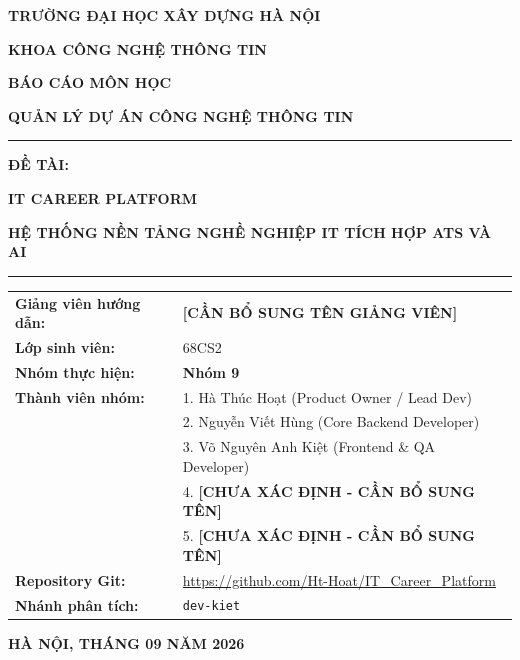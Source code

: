 \documentclass[12pt,a4paper,oneside]{report}
\begin{document}
\begin{titlepage}
\begin{center}
    {\fontsize{13}{16}\selectfont \textbf{TRƯỜNG ĐẠI HỌC XÂY DỰNG HÀ NỘI}\par}
    {\fontsize{13}{16}\selectfont \textbf{KHOA CÔNG NGHỆ THÔNG TIN}\par}
    \vspace{1.5cm}
    \vspace{1.5cm}
    {\fontsize{18}{22}\selectfont \textbf{BÁO CÁO MÔN HỌC}\par}
    {\fontsize{20}{26}\selectfont \textbf{QUẢN LÝ DỰ ÁN CÔNG NGHỆ THÔNG TIN}\par}
    \vspace{1cm}
    \rule{\textwidth}{1.5pt}\par
    \vspace{0.5cm}
    {\fontsize{16}{22}\selectfont \textbf{ĐỀ TÀI:}\par}
    \vspace{0.3cm}
    {\fontsize{18}{24}\selectfont \textbf{IT CAREER PLATFORM}\par}
    {\fontsize{15}{20}\selectfont \textbf{HỆ THỐNG NỀN TẢNG NGHỀ NGHIỆP IT TÍCH HỢP ATS VÀ AI}\par}
    \vspace{0.5cm}
    \rule{\textwidth}{1.5pt}\par
    \vspace{2cm}

    \begin{tabularx}{\textwidth}{p{4.5cm} X}
        \textbf{Giảng viên hướng dẫn:} & \textbf{[CẦN BỔ SUNG TÊN GIẢNG VIÊN]} \\
        \addlinespace
        \textbf{Lớp sinh viên:} & 68CS2 \\
        \addlinespace
        \textbf{Nhóm thực hiện:} & \textbf{Nhóm 9} \\
        \addlinespace
        \textbf{Thành viên nhóm:} & 1. Hà Thúc Hoạt (Product Owner / Lead Dev) \\
                                  & 2. Nguyễn Viết Hùng (Core Backend Developer) \\
                                  & 3. Võ Nguyên Anh Kiệt (Frontend \& QA Developer) \\
                                  & 4. \textbf{[CHƯA XÁC ĐỊNH - CẦN BỔ SUNG TÊN]} \\
                                  & 5. \textbf{[CHƯA XÁC ĐỊNH - CẦN BỔ SUNG TÊN]} \\
        \addlinespace
        \textbf{Repository Git:} & \url{https://github.com/Ht-Hoat/IT_Career_Platform} \\
        \textbf{Nhánh phân tích:} & \texttt{dev-kiet} \\
    \end{tabularx}

    \vfill
    {\fontsize{12}{15}\selectfont \textbf{HÀ NỘI, THÁNG 09 NĂM 2026}\par}
\end{center}
\end{titlepage}
\end{document}
